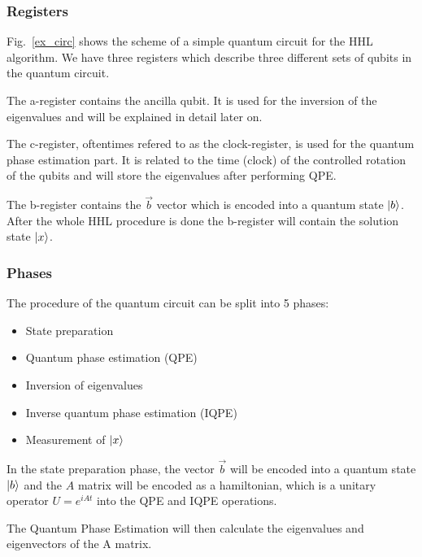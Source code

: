 \subsubsection{Registers}
Fig.~\ref{ex_circ} shows the scheme of a simple quantum circuit for the HHL algorithm.
We have three registers which describe three different sets of qubits in the quantum circuit.

The a-register contains the ancilla qubit. 
It is used for the inversion of the eigenvalues and will be explained in detail later on.

The c-register, oftentimes refered to as the clock-register, is used for the quantum phase estimation part. It is related to the time (clock) of the controlled rotation of the qubits and will store the eigenvalues after performing QPE.

The b-register contains the $\vec{b}$ vector which is encoded into a quantum state $\ket{b}$. 
After the whole HHL procedure is done the b-register will contain the solution state $\ket{x}$.



\subsubsection{Phases}
The procedure of the quantum circuit can be split into 5 phases:

\begin{itemize}
\item State preparation
\item Quantum phase estimation (QPE)
\item Inversion of eigenvalues
\item Inverse quantum phase estimation (IQPE)
\item Measurement of $\ket x$
\end{itemize}

In the state preparation phase, the vector $\vec{b}$ will be encoded into a quantum state $\ket{b}$ and the $A$ matrix will be encoded as a hamiltonian, which is a unitary operator
$U=e^{iAt}$ into the QPE and IQPE operations.

The Quantum Phase Estimation will then calculate the eigenvalues and eigenvectors of the A matrix.

